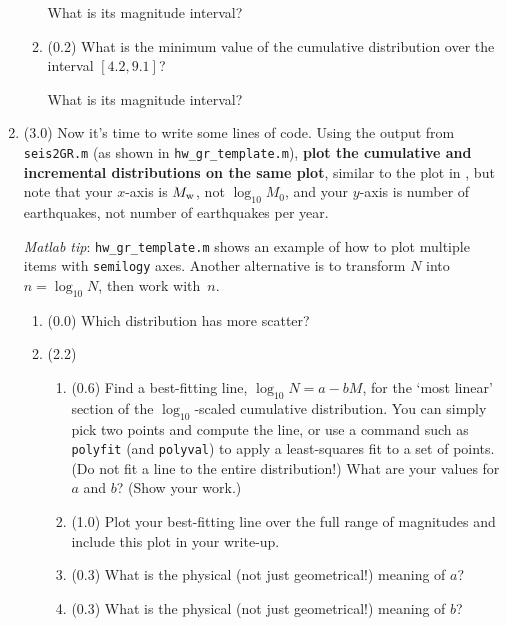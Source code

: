 \documentclass[11pt,titlepage,fleqn]{article}
\begin{document}
\begin{enumerate}
\begin{enumerate}
What is its magnitude interval?

\item (0.2) What is the minimum value of the cumulative distribution over the interval $[4.2,9.1]$? 

What is its magnitude interval?

\end{enumerate}


\item (3.0) Now it's time to write some lines of code. Using the output from \verb+seis2GR.m+ (as shown in \verb+hw_gr_template.m+), {\bf plot the cumulative and incremental distributions on the same plot}, similar to the plot in \citet[][Figure~4.7-2]{SteinWysession}, but note that your $x$-axis is $M_{\rm w}$, not $\log_{10} M_0$, and your $y$-axis is number of earthquakes, not number of earthquakes per year.

{\em Matlab tip}: \verb+hw_gr_template.m+ shows an example of how to plot multiple items with \verb+semilogy+ axes. Another alternative is to transform $N$ into $n = \log_{10} N$, then work with~$n$.

\begin{enumerate}
\item (0.0) Which distribution has more scatter?

\item (2.2)

\begin{enumerate}
\item (0.6) Find a best-fitting line, $\log_{10} N = a - b M$, for the `most linear' section of the $\log_{10}$-scaled cumulative distribution. You can simply pick two points and compute the line, or use a command such as \verb+polyfit+ (and \verb+polyval+) to apply a least-squares fit to a set of points. (Do not fit a line to the entire distribution!) What are your values for $a$ and $b$? (Show your work.)

\item (1.0) Plot your best-fitting line over the full range of magnitudes and include this plot in your write-up. 

\item (0.3) What is the physical (not just geometrical!) meaning of $a$?

\item (0.3) What is the physical (not just geometrical!) meaning of $b$?

\end{enumerate}


\end{enumerate}
\end{enumerate}
\end{document}
